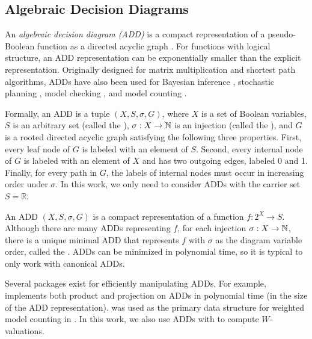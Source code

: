 \subsection{Algebraic Decision Diagrams}

An \emph{algebraic decision diagram (ADD)} is a compact representation of a pseudo-Boolean function as a directed acyclic graph \cite{bahar1997algebraic}.
For functions with logical structure, an ADD representation can be exponentially smaller than the explicit representation.
Originally designed for matrix multiplication and shortest path algorithms, ADDs have also been used for Bayesian inference \cite{chavira2007compiling,gogate2011approximation}, stochastic planning \cite{hoey1999spudd}, model checking \cite{kwiatkowska2007stochastic}, and model counting \cite{fargier2014knowledge,dudek2020addmc}.

Formally, an ADD is a tuple $(X, S, \sigma, G)$, where $X$ is a set of Boolean variables, $S$ is an arbitrary set (called the ), $\sigma: X \to \mathbb{N}$ is an injection (called the ), and $G$ is a rooted directed acyclic graph satisfying the following three properties.
First, every leaf node of $G$ is labeled with an element of $S$.
Second, every internal node of $G$ is labeled with an element of $X$ and has two outgoing edges, labeled 0 and 1.
Finally, for every path in $G$, the labels of internal nodes must occur in increasing order under $\sigma$.
In this work, we only need to consider ADDs with the carrier set $S = \mathbb{R}$.

An ADD $(X, S, \sigma, G)$ is a compact representation of a function $f: 2^X \to S$.
Although there are many ADDs representing $f$, for each injection $\sigma: X \to \mathbb{N}$, there is a unique minimal ADD that represents $f$ with $\sigma$ as the diagram variable order, called the .
ADDs can be minimized in polynomial time, so it is typical to only work with canonical ADDs.

Several packages exist for efficiently manipulating ADDs.
For example, \cudd{} \cite{somenzi2015cudd} implements both product and projection on ADDs in polynomial time (in the size of the ADD representation).
\cudd{} was used as the primary data structure for weighted model counting in \cite{dudek2020addmc}.
In this work, we also use ADDs with \cudd{} to compute $W$-valuations.

